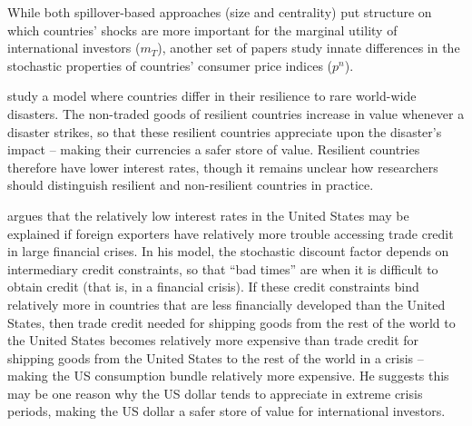 \documentclass{ar-1col}
\begin{document}
While both spillover-based approaches (size and centrality) put structure on which countries' shocks are more important for the marginal utility of international investors ($m_T$), another set of papers study innate differences in the stochastic properties of countries' consumer price indices ($p^n$).

\citet{FarhiGabaix2016} study a model where countries differ in their resilience to rare world-wide disasters. The non-traded goods of resilient countries increase in value whenever a disaster strikes, so that these resilient countries appreciate upon the disaster's impact -- making their currencies a safer store of value. Resilient countries therefore have lower interest rates, though it remains unclear how researchers should distinguish resilient and non-resilient countries in practice.

\citet{Maggiori2013} argues that the relatively low interest rates in the United States may be explained if foreign exporters have relatively more trouble accessing trade credit in large financial crises. In his model, the stochastic discount factor depends on intermediary credit constraints, so that ``bad times'' are when it is difficult to obtain credit (that is, in a financial crisis). If these credit constraints bind relatively more in countries that are less financially developed than the United States, then trade credit needed for shipping goods from the rest of the world to the United States becomes relatively more expensive than trade credit for shipping goods from the United States to the rest of the world in a crisis -- making the US consumption bundle relatively more expensive. He suggests this may be one reason why the US dollar tends to appreciate in extreme crisis periods, making the US dollar a safer store of value for international investors.
\end{document}
